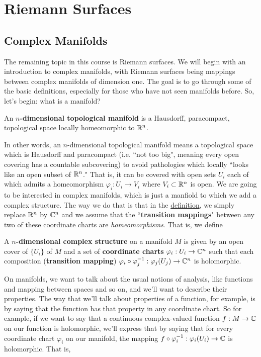 \documentclass{article}
\begin{document}
\section{Riemann Surfaces}

\subsection{Complex Manifolds}

The remaining topic in this course is Riemann surfaces. We will begin with an introduction to complex manifolds, with Riemann surfaces being mappings between complex manifolds of dimension one. The goal is to go through some of the basic definitions, especially for those who have not seen manifolds before. So, let's begin: what is a manifold?

\begin{definition}
An \textbf{\(n\)-dimensional topological manifold} is a Hausdorff, paracompact, topological space locally homeomorphic to \(\mathbb{R}^n\).
\label{def:topological_manifold}
\end{definition}

In other words, an \(n\)-dimensional topological manifold means a topological space which is Hausdorff and paracompact (i.e. ``not too big", meaning every open covering has a countable subcovering) to avoid pathologies which locally ``looks like an open subset of \(\mathbb{R}^n\)." That is, it can be covered with open sets \(U_i\) each of which admits a homeomorphism \(\varphi_i: U_i \to V_i\) where \(V_i \subset \mathbb{R}^n\) is open. We are going to be interested in complex manifolds, which is just a manfiold to which we add a complex structure. The way we do that is that in the \hyperref[def:topological_manifold]{definition}, we simply replace \(\mathbb{R}^n\) by \(\mathbb{C}^n\) and we assume that the ``\textbf{transition mappings}" between any two of these coordinate charts are \textit{homeomorphisms}. That is, we define

\begin{definition}
A \textbf{\(n\)-dimensional complex structure} on a manifold \(M\) is given by an open cover of \(\{U_i\}\) of \(M\) and a set of \textbf{coordinate charts} \(\varphi_i: U_i \to \mathbb{C}^n\) such that each composition (\textbf{transition mapping}) \(\varphi_i \circ \varphi_j^{-1}: \varphi_j(U_j) \to \mathbb{C}^n\) is holomorphic.
\end{definition}

On manifolds, we want to talk about the usual notions of analysis, like functions and mapping between spaces and so on, and we'll want to describe their properties. The way that we'll talk about properties of a function, for example, is by saying that the function has that property in any coordinate chart. So for example, if we want to say that a continuous complex-valued function \(f: M \to \mathbb{C}\) on our function is holomorphic, we'll express that by saying that for every coordinate chart \(\varphi_i\) on our manifold, the mapping \(f \circ \varphi_i^{-1}: \varphi_i(U_i) \to \mathbb{C}\) is holomorphic. That is,
\end{document}
